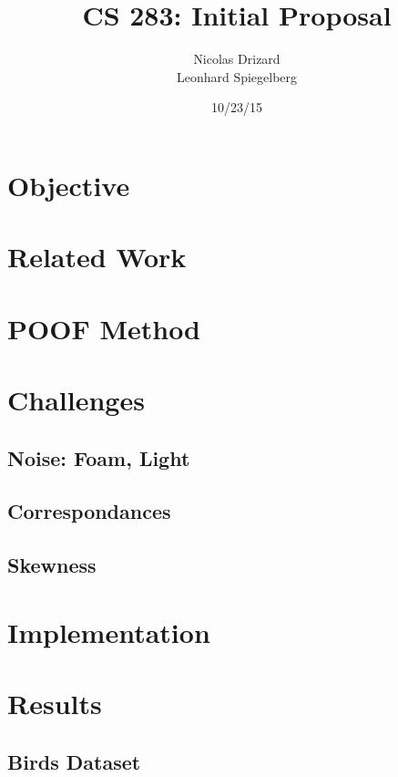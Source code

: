 \documentclass[11pt,a4paper,oneside]{article}
\begin{document}
\title{CS 283: Initial Proposal}
\author{Nicolas Drizard \\
Leonhard Spiegelberg}
\date{10/23/15}

\maketitle

\newpage

\section{Objective}


\section{Related Work}

\section{POOF Method}

\section{Challenges}

\subsection{Noise: Foam, Light}

\subsection{Correspondances}

\subsection{Skewness}

\section{Implementation}

\section{Results}

\subsection{Birds Dataset}
\end{document}
